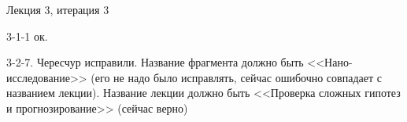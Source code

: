 \documentclass[12pt,a4paper]{article}
\begin{document}
Лекция 3, итерация 3

3-1-1 ок.

3-2-7. Чересчур исправили. Название фрагмента должно быть <<Нано-исследование>> (его не надо было исправлять, сейчас ошибочно совпадает с названием лекции). Название лекции должно быть <<Проверка сложных гипотез и прогнозирование>> (сейчас верно)
\end{document}
